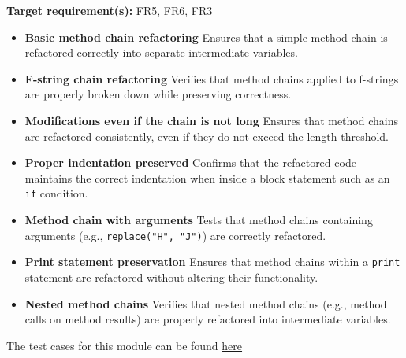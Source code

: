 \documentclass[12pt, titlepage]{article}
\begin{document}
  \noindent \textbf{Target requirement(s):} FR5, FR6, FR3 ~\cite{SRS} \\

  \begin{itemize}
    \item \textbf{Basic method chain refactoring} \newline
      Ensures that a simple method chain is refactored correctly into
      separate intermediate variables.

    \item \textbf{F-string chain refactoring} \newline
      Verifies that method chains applied to f-strings are properly
      broken down while preserving correctness.

    \item \textbf{Modifications even if the chain is not long} \newline
      Ensures that method chains are refactored consistently, even if
      they do not exceed the length threshold.

    \item \textbf{Proper indentation preserved} \newline
      Confirms that the refactored code maintains the correct
      indentation when inside a block statement such as an
      \texttt{if} condition.

    \item \textbf{Method chain with arguments} \newline
      Tests that method chains containing arguments (e.g.,
      \texttt{replace("H", "J")}) are correctly refactored.

    \item \textbf{Print statement preservation} \newline
      Ensures that method chains within a \texttt{print} statement
      are refactored without altering their functionality.

    \item \textbf{Nested method chains} \newline
      Verifies that nested method chains (e.g., method calls on
      method results) are properly refactored into intermediate variables.
  \end{itemize}

  \noindent The test cases for this module can be found
  \href{https://github.com/ssm-lab/capstone--source-code-optimizer/blob/new-poc/tests/refactorers/test_long_element_chain.py}{here}
\end{document}
